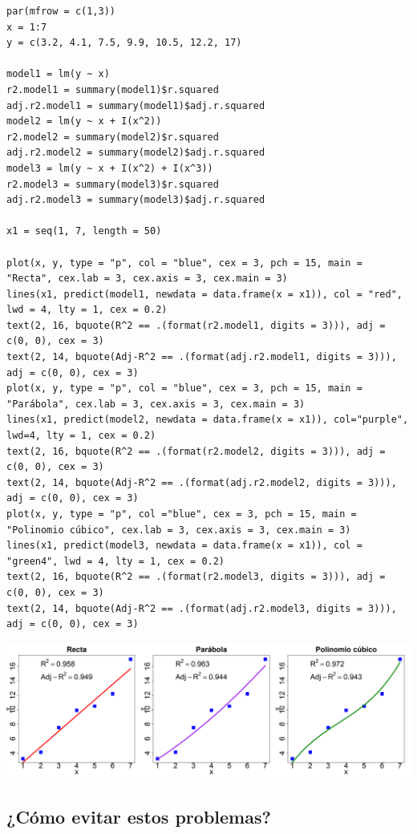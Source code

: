 \begin{lstlisting}
par(mfrow = c(1,3))
x = 1:7
y = c(3.2, 4.1, 7.5, 9.9, 10.5, 12.2, 17)

model1 = lm(y ~ x)
r2.model1 = summary(model1)$r.squared
adj.r2.model1 = summary(model1)$adj.r.squared
model2 = lm(y ~ x + I(x^2))
r2.model2 = summary(model2)$r.squared
adj.r2.model2 = summary(model2)$adj.r.squared
model3 = lm(y ~ x + I(x^2) + I(x^3))
r2.model3 = summary(model3)$r.squared
adj.r2.model3 = summary(model3)$adj.r.squared

x1 = seq(1, 7, length = 50)

plot(x, y, type = "p", col = "blue", cex = 3, pch = 15, main = "Recta", cex.lab = 3, cex.axis = 3, cex.main = 3)
lines(x1, predict(model1, newdata = data.frame(x = x1)), col = "red", lwd = 4, lty = 1, cex = 0.2)
text(2, 16, bquote(R^2 == .(format(r2.model1, digits = 3))), adj = c(0, 0), cex = 3)
text(2, 14, bquote(Adj-R^2 == .(format(adj.r2.model1, digits = 3))), adj = c(0, 0), cex = 3)
plot(x, y, type = "p", col = "blue", cex = 3, pch = 15, main = "Parábola", cex.lab = 3, cex.axis = 3, cex.main = 3)
lines(x1, predict(model2, newdata = data.frame(x = x1)), col="purple", lwd=4, lty = 1, cex = 0.2)
text(2, 16, bquote(R^2 == .(format(r2.model2, digits = 3))), adj = c(0, 0), cex = 3)
text(2, 14, bquote(Adj-R^2 == .(format(adj.r2.model2, digits = 3))), adj = c(0, 0), cex = 3)
plot(x, y, type = "p", col ="blue", cex = 3, pch = 15, main = "Polinomio cúbico", cex.lab = 3, cex.axis = 3, cex.main = 3)
lines(x1, predict(model3, newdata = data.frame(x = x1)), col = "green4", lwd = 4, lty = 1, cex = 0.2)
text(2, 16, bquote(R^2 == .(format(r2.model3, digits = 3))), adj = c(0, 0), cex = 3)
text(2, 14, bquote(Adj-R^2 == .(format(adj.r2.model3, digits = 3))), adj = c(0, 0), cex = 3)
\end{lstlisting}

\begin{center}
	\includegraphics[width=\linewidth]{"Temas/Imágenes/Tema 2/000040"}
\end{center}
\subsection*{¿Cómo evitar estos problemas?}
